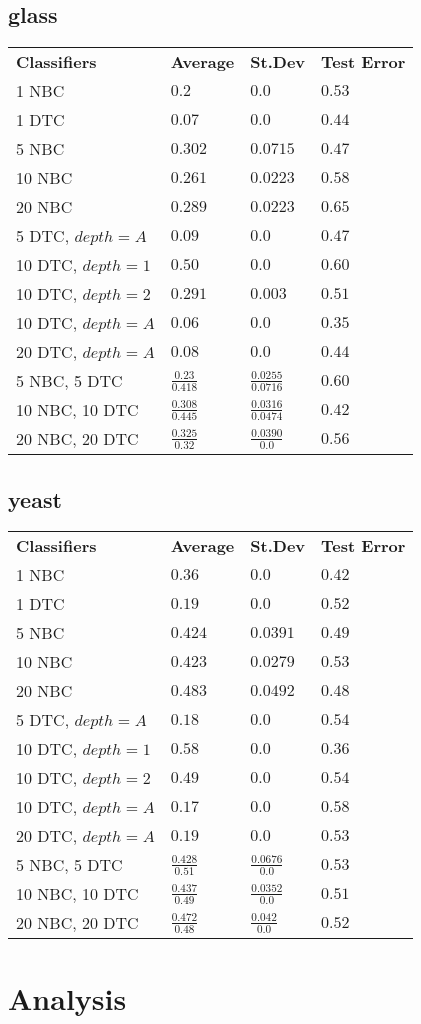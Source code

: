 \documentclass[12pt]{article}
\begin{document}
	\subsection{glass}
		\begin{tabular}{llll}
		\textbf{Classifiers} & \textbf{Average} & \textbf{St.Dev} & \textbf{Test Error}\\
			1 NBC & $0.2$ & $0.0$ & $0.53$\\
			1 DTC & $0.07$ & $0.0$ & $0.44$\\
			5 NBC & $0.302$ & $0.0715$ & $0.47$\\
			10 NBC & $0.261$ & $0.0223$ & $0.58$\\
			20 NBC & $0.289$ & $0.0223$ & $0.65$\\
			5 DTC, $depth = A$ & $0.09$ & $0.0$ & $0.47$ \\
			10 DTC, $depth = 1$ & $0.50$ & $0.0$ & $0.60$ \\
			10 DTC, $depth = 2$ & $0.291$ & $0.003$ & $0.51$ \\
			10 DTC, $depth = A$ & $0.06$ & $0.0$ & $0.35$ \\
			20 DTC, $depth = A$ & $0.08$ & $0.0$ & $0.44$ \\
			5 NBC, 5 DTC & $\frac{0.23}{0.418}$ & $\frac{0.0255}{0.0716}$ & $0.60$ \\
			10 NBC, 10 DTC & $\frac{0.308}{0.445}$ & $\frac{0.0316}{0.0474}$ & $0.42$ \\
			20 NBC, 20 DTC & $\frac{0.325}{0.32}$ & $\frac{0.0390}{0.0}$ & $0.56$ \\
		\end{tabular}
		
	\subsection{yeast}
		\begin{tabular}{llll}
		\textbf{Classifiers} & \textbf{Average} & \textbf{St.Dev} & \textbf{Test Error}\\
			1 NBC & $0.36$ & $0.0$ & $0.42$\\
			1 DTC & $0.19$ & $0.0$ & $0.52$\\
			5 NBC & $0.424$ & $0.0391$ & $0.49$\\
			10 NBC & $0.423$ & $0.0279$ & $0.53$\\
			20 NBC & $0.483$ & $0.0492$ & $0.48$\\
			5 DTC, $depth = A$ & $0.18$ & $0.0$ & $0.54$ \\
			10 DTC, $depth = 1$ & $0.58$ & $0.0$ & $0.36$ \\
			10 DTC, $depth = 2$ & $0.49$ & $0.0$ & $0.54$ \\
			10 DTC, $depth = A$ & $0.17$ & $0.0$ & $0.58$ \\
			20 DTC, $depth = A$ & $0.19$ & $0.0$ & $0.53$ \\
			5 NBC, 5 DTC & $\frac{0.428}{0.51}$ & $\frac{0.0676}{0.0}$ & $0.53$ \\
			10 NBC, 10 DTC & $\frac{0.437}{0.49}$ & $\frac{0.0352}{0.0}$ & $0.51$ \\
			20 NBC, 20 DTC & $\frac{0.472}{0.48}$ & $\frac{0.042}{0.0}$ & $0.52$ \\
		\end{tabular}
		
\section{Analysis}
\end{document}
